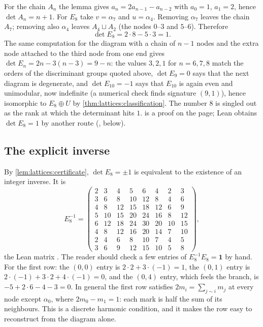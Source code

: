For the chain $A_n$ the lemma gives $a_n=2a_{n-1}-a_{n-2}$ with $a_0=1$, $a_1=2$, hence
$\det A_n=n+1$. For $E_8$ take $v=\alpha_7$ and $u=\alpha_4$. Removing $\alpha_7$ leaves the
chain $A_7$; removing also $\alpha_4$ leaves $A_4\sqcup A_2$ (the nodes $0$--$3$ and $5$--$6$).
Therefore
\begin{equation}\label{eq:lattices:detE8}
 \det E_8=2\cdot8-5\cdot3=1 .
\end{equation}
The same computation for the diagram with a chain of $n-1$ nodes and the extra node attached
to the third node from one end gives $\det E_n=2n-3(n-3)=9-n$: the values $3,2,1$ for
$n=6,7,8$ match the orders of the discriminant groups quoted above, $\det E_9=0$ says that
the next diagram is degenerate, and $\det E_{10}=-1$ says that $E_{10}$ is again even and
unimodular, now indefinite (a numerical check finds signature $(9,1)$), hence isomorphic to
$E_8\oplus U$ by \cref{thm:lattices:classification}. The number $8$ is singled out as the
rank at which the determinant hits $1$.  is a proof on the page; Lean obtains
$\det E_8=1$ by another route (, below).

\subsection{The explicit inverse}
By \cref{lem:lattices:certificate}, $\det E_8=\pm1$ is equivalent to the existence of an
integer inverse. It is
\begin{equation}\label{eq:lattices:E8inv}
 E_8^{-1}=\begin{pmatrix}
 2&3&4&5&6&4&2&3\\3&6&8&10&12&8&4&6\\4&8&12&15&18&12&6&9\\5&10&15&20&24&16&8&12\\
 6&12&18&24&30&20&10&15\\4&8&12&16&20&14&7&10\\2&4&6&8&10&7&4&5\\3&6&9&12&15&10&5&8
 \end{pmatrix},
\end{equation}
the Lean matrix . The reader should check a few entries of
$E_8^{-1}E_8=\mathbf1$ by hand. For the first row: the $(0,0)$ entry is
$2\cdot2+3\cdot(-1)=1$, the $(0,1)$ entry is $2\cdot(-1)+3\cdot2+4\cdot(-1)=0$, and the
$(0,4)$ entry, which feels the branch, is $-5+2\cdot6-4-3=0$. In general the first row
satisfies $2m_i=\sum_{j\sim i}m_j$ at every node except $\alpha_0$, where $2m_0-m_1=1$: each
mark is half the sum of its neighbours. This is a discrete harmonic condition, and it makes
the row easy to reconstruct from the diagram alone.

